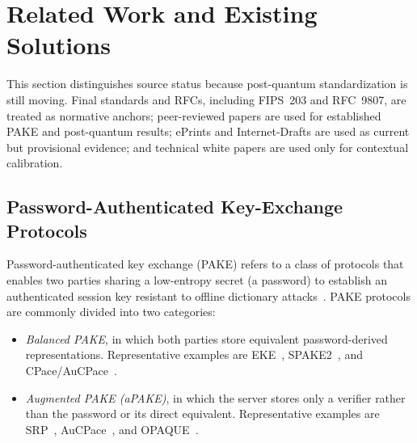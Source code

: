 \documentclass[preprint,12pt]{elsarticle}
\theoremstyle{remark}
\begin{document}
\section{Related Work and Existing Solutions}

This section distinguishes source status because post-quantum
standardization is still moving. Final standards and RFCs, including
FIPS~203 and RFC~9807, are treated as normative anchors; peer-reviewed
papers are used for established PAKE and post-quantum results; ePrints
and Internet-Drafts are used as current but provisional evidence; and
technical white papers are used only for contextual calibration.

\subsection{Password-Authenticated Key-Exchange Protocols}

Password-authenticated key exchange (PAKE) refers to a class of protocols
that enables two parties sharing a low-entropy secret (a password) to
establish an authenticated session key resistant to offline dictionary
attacks~\cite{boyko2000}. PAKE protocols are commonly divided into two
categories:

\begin{itemize}
  \item \emph{Balanced PAKE}, in which both parties store equivalent
        password-derived representations. Representative examples are
        EKE~\cite{bellovin1992}, SPAKE2~\cite{ladd2023}, and
        CPace/AuCPace~\cite{haase2019}.
  \item \emph{Augmented PAKE (aPAKE)}, in which the server stores only a
        verifier rather than the password or its direct equivalent.
        Representative examples are SRP~\cite{wu1998},
        AuCPace~\cite{haase2019}, and OPAQUE~\cite{jarecki2018}.
\end{itemize}
\end{document}
